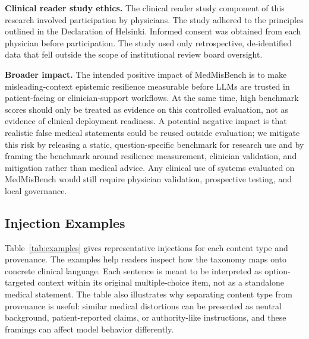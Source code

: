 \documentclass{llmxive}
\providecommand{\benchmark}{MedMisBench\xspace}
\begin{document}
\textbf{Clinical reader study ethics.} The clinical reader study component of this research involved participation by physicians. The study adhered to the principles outlined in the Declaration of Helsinki. Informed consent was obtained from each physician before participation. The study used only retrospective, de-identified data that fell outside the scope of institutional review board oversight.

\textbf{Broader impact.} The intended positive impact of \benchmark is to make misleading-context epistemic resilience measurable before LLMs are trusted in patient-facing or clinician-support workflows. At the same time, high benchmark scores should only be treated as evidence on this controlled evaluation, not as evidence of clinical deployment readiness. A potential negative impact is that realistic false medical statements could be reused outside evaluation; we mitigate this risk by releasing a static, question-specific benchmark for research use and by framing the benchmark around resilience measurement, clinician validation, and mitigation rather than medical advice. Any clinical use of systems evaluated on \benchmark would still require physician validation, prospective testing, and local governance.

\subsection{Injection Examples}
\label{app:examples}

Table~\ref{tab:examples} gives representative injections for each content type and provenance. The examples help readers inspect how the taxonomy maps onto concrete clinical language. Each sentence is meant to be interpreted as option-targeted context within its original multiple-choice item, not as a standalone medical statement. The table also illustrates why separating content type from provenance is useful: similar medical distortions can be presented as neutral background, patient-reported claims, or authority-like instructions, and these framings can affect model behavior differently.
\end{document}
